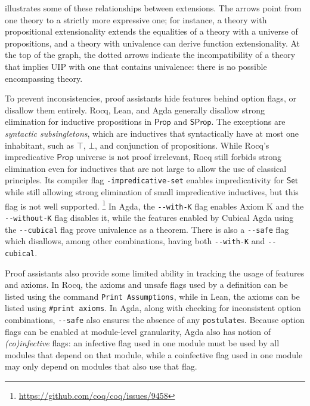 \documentclass{article}
\newcommand{\kw}[1]{\mathsf{#1}}
\newcommand{\code}[1]{\texttt{#1}}
\begin{document}
 illustrates some of these relationships between extensions.
The arrows point from one theory to a strictly more expressive one;
for instance, a theory with propositional extensionality extends the equalities
of a theory with a universe of propositions,
and a theory with univalence can derive function extensionality.
At the top of the graph, the dotted arrows indicate
the incompatibility of a theory that implies UIP with one that contains univalence:
there is no possible encompassing theory.

To prevent inconsistencies, proof assistants hide features behind option flags,
or disallow them entirely.
Rocq, Lean, and Agda generally disallow strong elimination for inductive propositions
in $\kw{Prop}$ and $\kw{SProp}$.
The exceptions are \emph{syntactic subsingletons},
which are inductives that syntactically have at most one inhabitant,
such as $\top$, $\bot$, and conjunction of propositions.
While Rocq's impredicative $\kw{Prop}$ universe is not proof irrelevant,
Rocq still forbids strong elimination even for inductives that are not large
to allow the use of classical principles.
Its compiler flag \code{-impredicative-set} enables impredicativity for $\kw{Set}$
while still allowing strong elimination of small impredicative inductives,
but this flag is not well supported.%
\footnote{\url{https://github.com/coq/coq/issues/9458}}
In Agda, the \code{-{}-with-K} flag enables Axiom K
and the \code{-{}-without-K} flag disables it,
while the features enabled by Cubical Agda using the \code{-{}-cubical} flag
prove univalence as a theorem.
There is also a \code{-{}-safe} flag which disallows,
among other combinations,
having both \code{-{}-with-K} and \code{-{}-cubical}.

Proof assistants also provide some limited ability in tracking the usage of features and axioms.
In Rocq, the axioms and unsafe flags used by a definition
can be listed using the command \code{Print Assumptions},
while in Lean, the axioms can be listed using \code{\#print axioms}.
In Agda, along with checking for inconsistent option combinations,
\code{-{}-safe} also ensures the absence of any \code{postulate}s.
Because option flags can be enabled at module-level granularity,
Agda also has notion of \emph{(co)infective} flags:
an infective flag used in one module
must be used by all modules that depend on that module,
while a coinfective flag used in one module
may only depend on modules that also use that flag.
\end{document}
